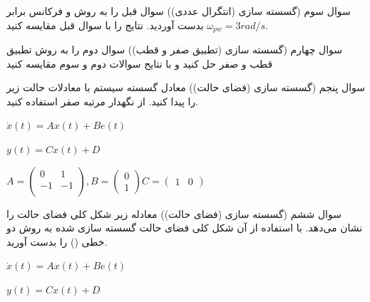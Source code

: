 \documentclass[12pt]{article}
\begin{document}
    \begin{problem}{سوال سوم}
    	(گسسته سازی (انتگرال عددی))
سوال قبل را به روش 
و فرکانس 
برابر 
$\omega_{pw} = 3 rad/s$
بدست آوردید.
نتایج را با سوال قبل مقایسه کنید.
    \end{problem}
    
    
    \begin{problem}{سوال چهارم}
    	(گسسته سازی (تطبیق صفر و قطب)) سوال دوم را به روش تطبیق قطب و صفر حل کنید و با نتایح سوالات دوم و سوم مقایسه کنید
    	
    	
    \end{problem}
    
    \begin{problem}{سوال پنجم}
    	(گسسته سازی (فضای حالت)) معادل گسسته سیستم با معادلات حالت زیر را پیدا کنید.
    	از نگهدار مرتبه صفر استفاده کنید.
    	
    	    	\centering
    	$
    	\dot{x}(t)=Ax(t)+Be(t) 
    	$
    	
    	$
    	y(t)=Cx(t)+D 
    	$
    	
    	$
    		 A=\left( \begin{matrix}
    			0 & 1 \\  
    			-1 & -1 \\ 
    		\end{matrix} \right),B=\left( \begin{matrix}
    			0 \\
    			1  
    		\end{matrix} \right)  
    		 C=\left( \begin{matrix}
    			1 & 0  
    		\end{matrix} \right) 
    	$
    \end{problem}
    
    \begin{problem}{سوال ششم}
    	(گسسته سازی (فضای حالت)) معادله زیر شکل کلی فضای حالت را نشان می‌دهد. با استفاده از آن شکل کلی فضای حالت گسسته سازی شده به روش دو خطی () را بدست آورید.
    
    	\centering
$
    		 \dot{x}(t)=Ax(t)+Be(t) 
$

$
    		 y(t)=Cx(t)+D 
$
    	
	
	
	\end{problem}    
    
\end{document}

